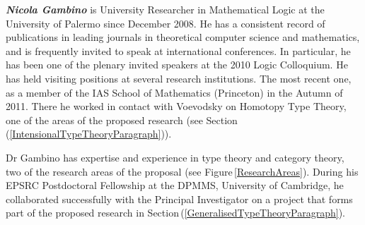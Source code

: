 \documentclass[11pt,twocolumn]{article}
\newcommand{\pref}[1]{\,(\ref{#1})}
\begin{document}
\smallskip\noindent
\textbf{\em Nicola Gambino}
%
%
is University Researcher in Mathematical Logic at the University of Palermo
since December 2008.  He has a consistent record of publications in leading
journals in theoretical computer science and mathematics, and is frequently
invited to speak at international conferences.  
In particular, he has been one of the plenary invited speakers at the 2010
Logic Colloquium.  
He has held visiting positions at several research institutions. 
The most recent one, as %
a member of the IAS School of Mathematics (Princeton) in the Autumn of 2011.
There he worked in contact with Voevodsky %
on Homotopy Type Theory, one of the areas of the proposed research (see
Section\pref{IntensionalTypeTheoryParagraph}). 

Dr Gambino has expertise and experience in type theory and category theory,
two of the research areas of the proposal (see Figure\,\ref{ResearchAreas}). 
During his EPSRC Postdoctoral Fellowship at the DPMMS, University of
Cambridge, he collaborated successfully with the Principal Investigator on a
project that forms part of the proposed research in
Section\pref{GeneralisedTypeTheoryParagraph}.
\end{document}
